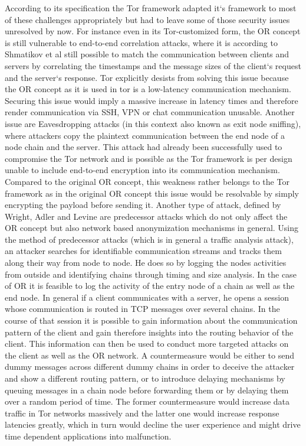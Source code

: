 \documentclass{sig-alternate}
\begin{document}
According to its specification\cite{torspec} the Tor framework adapted it`s framework to most of these challenges appropriately but had to leave some of those security issues unresolved by now. For instance even in its Tor-customized form, the OR concept is still vulnerable to end-to-end correlation attacks, where it is according to Shmatikov et al\cite{shmatikov2006timing} still possible to match the communication between clients and servers by correlating the timestamps and the message sizes of the client`s request and the server`s response. Tor explicitly desists from solving this issue because the OR concept as it is used in tor is a low-latency communication mechanism. Securing this issue would imply a massive increase in latency times and therefore render communication via SSH, VPN or chat communication unusable. Another issue are Eavesdropping attacks (in this context also known as exit node sniffing), where attackers copy the plaintext communication between the end node of a node chain and the server. This attack had already been successfully used to compromise the Tor network\cite{eavesdrop} and is possible as the Tor framework is per design unable to include end-to-end encryption into its communication mechanism. Compared to the original OR concept, this weakness rather belongs to the Tor framework as in the original OR concept this issue would be resolvable by simply encrypting the payload before sending it. Another type of attack, defined by Wright, Adler and Levine\cite{wright2004predecessor} are predecessor attacks which do not only affect the OR concept but also network based anonymization mechanisms in general. Using the method of predecessor attacks (which is in general a traffic analysis attack), an attacker searches for identifiable communication streams and tracks them along their way from node to node. He does so by logging the nodes activities from outside and identifying chains through timing and size analysis. In the case of OR it is feasible to log the activity of the entry node of a chain as well as the end node. In general if a client communicates with a server, he opens a session whose communication is routed in TCP messages over several chains. In the course of that session it is possible to gain information about the communication pattern of the client and gain therefore insights into the routing behavior of the client. This information can then be used to conduct more targeted attacks on the client as well as the OR network. A countermeasure would be either to send dummy messages across different dummy chains in order to deceive the attacker and show a different routing pattern, or to introduce delaying mechanisms by queuing messages in a chain node before forwarding them or by delaying them over a random period of time. The former countermeasure would increase data traffic in Tor networks massively and the latter one would increase response latencies greatly, which in turn would decline the user experience and might drive time dependent applications into malfunction. 
\end{document}
